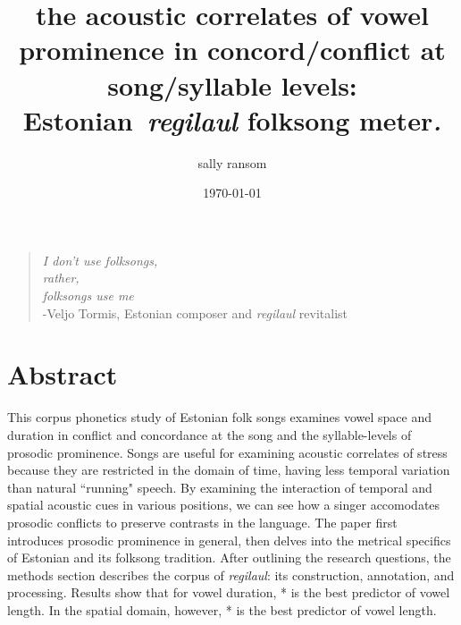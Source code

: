 \documentclass[11pt]{article}
\begin{document}
\title{the acoustic correlates of vowel prominence in concord/conflict at song/syllable
levels: Estonian~\emph{regilaul} folksong meter\emph{.}}




\author[]{sally ransom}%
%


\vspace{-1em}



  \date{\today}


\begingroup
\let\center\flushleft
\let\endcenter\endflushleft
\maketitle
\endgroup


\bigskip
\begin{quote}\begin{center}
{\it I don't use folksongs, \\
rather,\\
folksongs use me}\\
-Veljo Tormis, Estonian composer and {\it regilaul} revitalist
\end{center}
\end{quote}


\titlepage





\sloppy







\section*{Abstract}

 This corpus phonetics study of Estonian folk songs examines vowel space and duration in conflict and concordance at the song and the syllable-levels of prosodic prominence. Songs are useful for examining acoustic correlates of stress because they are restricted in the domain of time, having less temporal variation than natural ``running" speech. By examining the interaction of temporal and spatial acoustic cues in various positions, we can see how a singer accomodates prosodic conflicts to preserve contrasts in the language. The paper first introduces prosodic prominence in general, then delves into the metrical specifics of Estonian and its folksong tradition. After outlining the research questions, the methods section describes the corpus of {\it regilaul}: its construction, annotation, and processing. Results show that for vowel duration, * is the best predictor of vowel length. In the spatial domain, however, * is the best predictor of vowel length.
 
\end{document}
